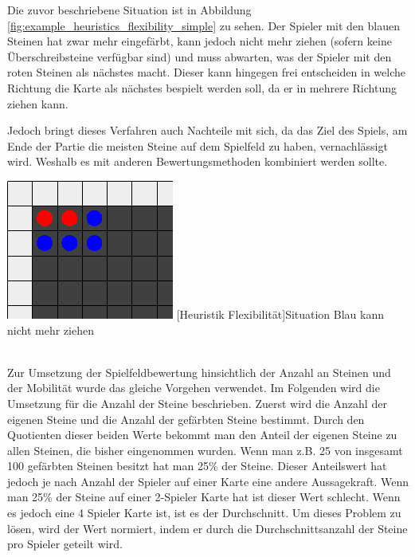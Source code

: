 \documentclass[12pt,a4paper,bibliography=totocnumbered,listof=totocnumbered]{article}
\begin{document}
Die zuvor beschriebene Situation ist in Abbildung \ref{fig:example_heuristics_flexibility_simple} zu sehen. Der Spieler mit den blauen Steinen hat zwar mehr eingefärbt, kann jedoch nicht mehr ziehen (sofern keine Überschreibsteine verfügbar sind) und muss abwarten, was der Spieler mit den roten Steinen als nächstes macht. Dieser kann hingegen frei entscheiden in welche Richtung die Karte als nächstes bespielt werden soll, da er in mehrere Richtung ziehen kann.

Jedoch bringt dieses Verfahren auch Nachteile mit sich, da das Ziel des Spiels, am Ende der Partie die meisten Steine auf dem Spielfeld zu haben, vernachlässigt wird. Weshalb es mit anderen Bewertungsmethoden kombiniert werden sollte.

\vspace{1em}
\begin{minipage}{\linewidth}
	\centering
	\includegraphics[width=0.3\linewidth]{pics/heuristics_flexibility_simple_v2.png}
	[Heuristik Flexibilität]{Situation Blau kann nicht mehr ziehen}
	\label{fig:example_heuristics_flexibility_simple}
\end{minipage}
\\


Zur Umsetzung der Spielfeldbewertung hinsichtlich der Anzahl an Steinen und der Mobilität wurde das gleiche Vorgehen verwendet. Im Folgenden wird die Umsetzung für die Anzahl der Steine beschrieben.
Zuerst wird die Anzahl der eigenen Steine und die Anzahl der gefärbten Steine bestimmt. Durch den Quotienten dieser beiden Werte bekommt man den Anteil der eigenen Steine zu allen Steinen, die bisher eingenommen wurden. Wenn man z.B. 25 von insgesamt 100 gefärbten Steinen besitzt hat man 25\% der Steine. Dieser Anteilswert hat jedoch je nach Anzahl der Spieler auf einer Karte eine andere Aussagekraft. Wenn man 25\% der Steine auf einer 2-Spieler Karte hat ist dieser Wert schlecht. Wenn es jedoch eine 4 Spieler Karte ist, ist es der Durchschnitt. Um dieses Problem zu lösen, wird der Wert normiert, indem er durch die Durchschnittsanzahl der Steine pro Spieler geteilt wird. 
\end{document}
